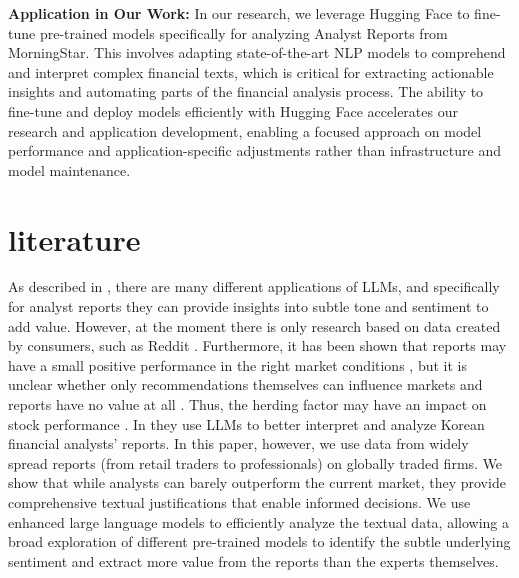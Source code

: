 \documentclass[conference]{IEEEtran}
\begin{document}
\textbf{Application in Our Work:} In our research, we leverage Hugging Face to fine-tune pre-trained models specifically for analyzing Analyst Reports from MorningStar. This involves adapting state-of-the-art NLP models to comprehend and interpret complex financial texts, which is critical for extracting actionable insights and automating parts of the financial analysis process. The ability to fine-tune and deploy models efficiently with Hugging Face accelerates our research and application development, enabling a focused approach on model performance and application-specific adjustments rather than infrastructure and model maintenance.

\section{literature}%

As described in \cite{Zhao2024}, there are many different applications of LLMs, and specifically for analyst reports they can provide insights into subtle tone and sentiment to add value. However, at the moment there is only research based on   data created by consumers, such as Reddit \cite{Deng2023}. Furthermore, it has been shown that reports may have a small positive performance in the right market conditions \cite{Su2020}, but it is unclear whether only recommendations themselves can influence markets \cite{Brauer2018} and reports have no value at all \cite{Panchenko2007}. Thus, the herding factor may have an impact on stock performance \cite{Palmer2018}.
In \cite{Kim2023} they use LLMs to better interpret and analyze Korean financial analysts' reports.
In this paper, however, we use data from widely spread reports (from retail traders to professionals) on globally traded firms. We show that while analysts can barely outperform the current market, they provide comprehensive textual justifications that enable informed decisions. We use enhanced large language models to efficiently analyze the textual data, allowing a broad exploration of different pre-trained models to identify the subtle underlying sentiment and extract more value from the reports than the experts themselves.
\end{document}
